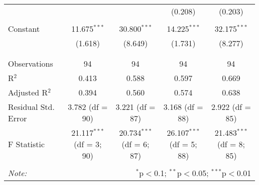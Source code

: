 \documentclass[10pt,a4paper]{article}
\begin{document}
\begin{landscape}
\begin{table}[!htbp]
\begin{tabular}{@{\extracolsep{5pt}}lcccc}
  &  &  & (0.208) & (0.203) \\ 
  & & & & \\ 
 Constant & 11.675$^{***}$ & 30.800$^{***}$ & 14.225$^{***}$ & 32.175$^{***}$ \\ 
  & (1.618) & (8.649) & (1.731) & (8.277) \\ 
  & & & & \\ 
\hline \\[-1.8ex] 
Observations & 94 & 94 & 94 & 94 \\ 
R$^{2}$ & 0.413 & 0.588 & 0.597 & 0.669 \\ 
Adjusted R$^{2}$ & 0.394 & 0.560 & 0.574 & 0.638 \\ 
Residual Std. Error & 3.782 (df = 90) & 3.221 (df = 87) & 3.168 (df = 88) & 2.922 (df = 85) \\ 
F Statistic & 21.117$^{***}$ (df = 3; 90) & 20.734$^{***}$ (df = 6; 87) & 26.107$^{***}$ (df = 5; 88) & 21.483$^{***}$ (df = 8; 85) \\ 
\hline 
\hline \\[-1.8ex] 
\textit{Note:}  & \multicolumn{4}{r}{$^{*}$p$<$0.1; $^{**}$p$<$0.05; $^{***}$p$<$0.01} \\ 
\end{tabular} 
\end{table}
\end{landscape}
 
\end{document}
